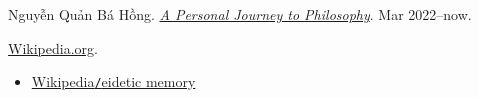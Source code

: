 \documentclass[oneside]{book}
\numberwithin{equation}{section}
\begin{document}
\begin{thebibliography}{99}
	 Nguyễn Quản Bá Hồng. \href{https://github.com/NQBH/hobby/blob/master/philosophy/NQBH_a_personal_journey_to_philosophy.pdf}{\textit{A Personal Journey to Philosophy}}. Mar 2022--now.
	
	 \href{https://en.wikipedia.org/wiki/Main_Page}{Wikipedia.org}.
	\begin{itemize}
		\item \href{https://en.wikipedia.org/wiki/Eidetic_memory}{Wikipedia\texttt{/}eidetic memory}
	\end{itemize}
\end{thebibliography}

\printbibliography[heading=bibintoc]
	
\end{document}

